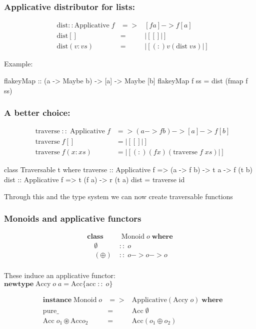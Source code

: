 \documentclass[18pt]{beamer}
\begin{document}
\begin{frame}[fragile] \frametitle{Applicative distributor for lists:}
\begin{align*}
&\mathrm{dist} :: \mathrm{Applicative} \; f &=>& [f a] -> f [a]\\
&\mathrm{dist} [] &=& |[ [] |]\\
  &\mathrm{dist} (v : vs) &=&  |[ (:) v (\mathrm{dist} \; vs) |]
\end{align*}

Example:\\
\begin{code}
flakeyMap :: (a -> Maybe b)
                 -> [a] -> Maybe [b]
flakeyMap f ss = dist (fmap f ss)
\end{code}
\end{frame}

\begin{frame}[fragile] \frametitle{A better choice:}

\begin{align*}
&\mathrm{traverse} \; :: \; \mathrm{Applicative} \; f &=> (a -> f b) -> [a] -> f [b]\\
&\mathrm{traverse} \; f [] &= |[ [] |]\\
&\mathrm{traverse} \; f (x :xs) &= |[(:)(f x)(\mathrm{traverse} \; f \; xs)|]
\end{align*}

\begin{code}
class Traversable t where
traverse :: Applicative f => (a -> f b) -> t a -> f (t b)
dist  :: Applicative f => t (f a) -> r (t a)
dist = traverse id
\end{code}
Through this and the type system we can now create traversable functions
\end{frame}

\begin{frame}[fragile]\frametitle{Monoids and applicative functors}
\begin{align*}
\mathbf{class} & \; \mathrm{Monoid} \; o \; \mathbf{where}\\
\quad \emptyset \;& :: \; o\\
\quad (\oplus) \;& :: \; o -> o -> o
\end{align*}  \\
These induce an applicative functor:\\
$\mathbf{newtype} \; \mathrm{Accy} \; o\; a = \mathrm{Acc} \{\mathrm{acc} \; :: \;o \}$

\begin{align*}
&\mathbf{instance} \; \mathrm{Monoid} \; o &=>& \mathrm{Applicative} (\mathrm{Accy}\; o) \; \mathbf{where}\\
&\mathrm{pure} \_ &=& \mathrm{Acc} \; \emptyset\\
&\mathrm{Acc} \; o_1 \circledast \mathrm{Acc} o_2 &=& \mathrm{Acc}(o_1 \oplus o_2)
\end{align*}
\end{frame}
\end{document}
